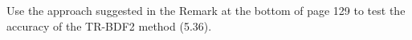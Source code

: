 

Use the approach suggested in the Remark at the bottom of page 129 to test
the accuracy of the TR-BDF2 method (5.36).
